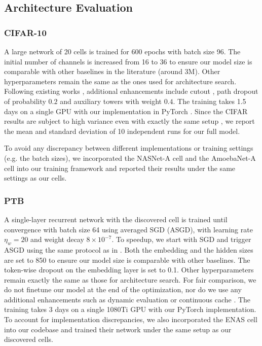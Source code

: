 \documentclass{article}
\begin{document}
\subsection{Architecture Evaluation}
\subsubsection{CIFAR-10}
\label{sec:eval-cifar10}
A large network of 20 cells is trained for 600 epochs with batch size 96.
The initial number of channels is increased from 16 to 36 to ensure our model size is comparable with other baselines in the literature (around 3M).
Other hyperparameters remain the same as the ones used for architecture search.
Following existing works \citep{pham2018efficient, zoph2017learning, liu2017progressive, real2018regularized},
additional enhancements include cutout \citep{devries2017improved},
path dropout of probability $0.2$ and auxiliary towers with weight $0.4$.
The training takes 1.5 days on a single GPU
with our implementation in PyTorch \citep{paszke2017automatic}.
Since the CIFAR results are subject to high variance even with exactly the same setup \citep{liu2017hierarchical},
we report the mean and standard deviation of 10 independent runs for our full model.

To avoid any discrepancy between different implementations or training settings (e.g. the batch sizes),
we incorporated the NASNet-A cell \citep{zoph2017learning} and the AmoebaNet-A cell \citep{real2018regularized} into our training framework and reported their results under the same settings as our cells.

\subsubsection{PTB}
\label{sec:eval-ptb}
A single-layer recurrent network with the discovered cell is trained until convergence with batch size 64 using averaged SGD \citep{polyak1992acceleration} (ASGD),
with learning rate $\eta_w=20$ and weight decay $8\times 10^{-7}$.
To speedup,
we start with SGD and trigger ASGD 
using the same protocol as in \cite{yang2017breaking, merity2017regularizing}.
Both the embedding and the hidden sizes are set to 850 
to ensure our model size is comparable with other baselines.
The token-wise dropout on the embedding layer is set to 0.1.
Other hyperparameters remain exactly the same as those for architecture search.
For fair comparison,
we do not finetune our model at the end of the optimization,
nor do we use any additional enhancements such as dynamic evaluation \citep{krause2017dynamic} or continuous cache \citep{grave2016improving}.
The training takes 3 days on a single 1080Ti GPU with our PyTorch implementation.
To account for implementation discrepancies,
we also incorporated the ENAS cell \citep{pham2018efficient}
into our codebase and trained their network under the same setup as our discovered cells.
\end{document}
